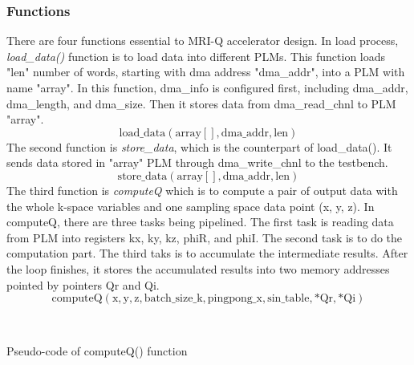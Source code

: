 \documentclass{sig-alternate}
\begin{document}
\subsubsection{Functions}
There are four functions essential to MRI-Q accelerator design. In load process, \textit{load\_data()} function is to load data into different PLMs. This function loads "len" number of words, starting with dma address "dma\_addr", into a PLM with name "array". In this function, dma\_info is configured first, including dma\_addr, dma\_length, and dma\_size. Then it stores data from dma\_read\_chnl to PLM "array".
$$\mathrm{load\_data(array[], dma\_addr, len)}$$
 The second function is \textit{store\_data}, which is the counterpart of load\_data(). It sends data stored in "array" PLM through dma\_write\_chnl to the testbench.
$$\mathrm{store\_data(array[], dma\_addr, len)}$$
The third function is \textit{computeQ} which is to compute a pair of output data with the whole k-space variables and one sampling space data point (x, y, z). In computeQ, there are three tasks being pipelined. The first task is reading data from PLM into registers kx, ky, kz, phiR, and phiI. The second task is to do the computation part. The third taks is to accumulate the intermediate results. After the loop finishes, it stores the accumulated results into two memory addresses pointed by pointers Qr and Qi.
$$\mathrm{computeQ(x, y, z, batch\_size\_k, pingpong\_x, sin\_table, *Qr, *Qi)}$$

\\

\begin{algorithm}[H]
\SetAlgoLined
\caption{Pseudo-code of computeQ() function}
\end{algorithm}
\end{document}
